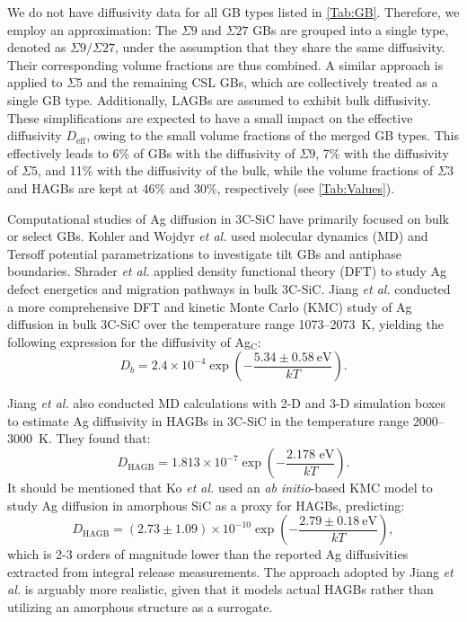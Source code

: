 \documentclass[%
preprint,
amsmath,amssymb,
aps,
]{revtex4-2}
\newcommand{\?}{\stackrel{?}{=}}
\begin{document}
We do not have diffusivity data for all GB types listed in \cref{Tab:GB}. Therefore, we employ an approximation: The $\Sigma 9$ and $\Sigma 27$ GBs are grouped into a single type, denoted as $\Sigma 9 / \Sigma 27$, under the assumption that they share the same diffusivity. Their corresponding volume fractions are thus combined. A similar approach is applied to $\Sigma 5$ and the remaining CSL GBs, which are collectively treated as a single GB type. Additionally, LAGBs are assumed to exhibit bulk diffusivity. These simplifications are expected to have a small impact on the effective diffusivity $D_\text{eff}$, owing to the small volume fractions of the merged GB types. This effectively leads to 6\% of GBs with the diffusivity of $\Sigma 9$, 7\% with the diffusivity of $\Sigma 5$, and 11\% with the diffusivity of the bulk, while the volume fractions of $\Sigma 3$ and HAGBs are kept at 46\% and 30\%, respectively (see \cref{Tab:Values}).

Computational studies of Ag diffusion in 3C-SiC have primarily focused on bulk or select GBs. Kohler \cite{Kohler2002} and Wojdyr \textit{et al.} \cite{Wojdyr2010} used molecular dynamics (MD) and Tersoff potential parametrizations to investigate tilt GBs and antiphase boundaries. Shrader \textit{et al.} \cite{Shrader2011} applied density functional theory (DFT) to study Ag defect energetics and migration pathways in bulk 3C-SiC. Jiang \textit{et al.} \cite{Jiang2021} conducted a more comprehensive DFT and kinetic Monte Carlo (KMC) study of Ag diffusion in bulk 3C-SiC over the temperature range 1073--2073~K, yielding the following expression for the diffusivity of Ag$_\text{C}$:
\begin{equation}
D_b = 2.4 \times 10^{-4} \exp\left(- \frac{5.34 \pm 0.58 \ \text{eV}}{k T} \right).
\end{equation}

Jiang \textit{et al.} also conducted MD calculations with 2-D and 3-D simulation boxes to estimate Ag diffusivity in HAGBs in 3C-SiC in the temperature range 2000--3000~K. They found that:
\begin{equation}
D_\text{HAGB} = 1.813 \times 10^{-7} \exp \left( - \frac{2.178 \text{ eV}}{k T} \right).
\end{equation}
It should be mentioned that Ko \textit{et al.} \cite{Ko2016} used an \textit{ab initio}-based KMC model to study Ag diffusion in amorphous SiC as a proxy for HAGBs, predicting:
\begin{equation}
D_\text{HAGB} = (2.73 \pm 1.09) \times 10^{-10} \exp\left(- \frac{2.79 \pm 0.18 \ \text{eV}}{k T} \right),
\end{equation}
which is 2-3 orders of magnitude lower than the reported Ag diffusivities extracted from integral release measurements. The approach adopted by Jiang \textit{et al.} is arguably more realistic, given that it models actual HAGBs rather than utilizing an amorphous structure as a surrogate.
\end{document}
